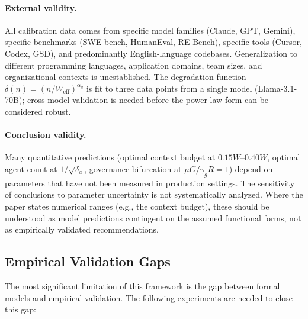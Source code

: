 \documentclass[11pt, a4paper]{googledeepmind}
\begin{document}
\paragraph{External validity.} All calibration data comes from specific model families (Claude, GPT, Gemini), specific benchmarks (SWE-bench, HumanEval, RE-Bench), specific tools (Cursor, Codex, GSD), and predominantly English-language codebases. Generalization to different programming languages, application domains, team sizes, and organizational contexts is unestablished. The degradation function $\delta(n) = (n/W_{\text{eff}})^{\alpha_d}$ is fit to three data points from a single model (Llama-3.1-70B); cross-model validation is needed before the power-law form can be considered robust.

\paragraph{Conclusion validity.} Many quantitative predictions (optimal context budget at $0.15W$--$0.40W$, optimal agent count at $1/\sqrt{\delta_a}$, governance bifurcation at $\mu G / \gamma_g R = 1$) depend on parameters that have not been measured in production settings. The sensitivity of conclusions to parameter uncertainty is not systematically analyzed. Where the paper states numerical ranges (e.g., the context budget), these should be understood as model predictions contingent on the assumed functional forms, not as empirically validated recommendations.

\subsection{Empirical Validation Gaps}

The most significant limitation of this framework is the gap between formal models and empirical validation. The following experiments are needed to close this gap:
\end{document}
